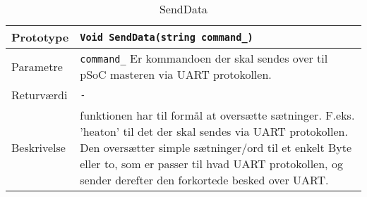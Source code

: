 \begin{table}[h]
\begin{tabularx}{\textwidth}{| L{2.5 cm} | Z |} \hline
Prototype & \texttt{Void SendData(string command\_)} \\\hline
Parametre & \texttt{command\_} \newline
Er kommandoen der skal sendes over til pSoC masteren via UART protokollen. \\\hline
Returværdi & \texttt{-} \\\hline
Beskrivelse & funktionen har til formål at oversætte sætninger. F.eks. ’heaton’ til det der skal sendes via UART protokollen. Den oversætter simple sætninger/ord til et enkelt Byte eller to, som er passer til hvad UART protokollen, og sender derefter den forkortede besked over UART. \\\hline
\end{tabularx}
\caption{SendData}
\label{table:UART_SendData}
\end{table}
